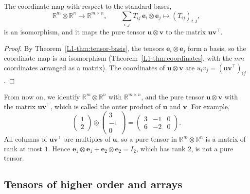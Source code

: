 \begin{corollary}\label{L1-cor:tensor-matrices}
    The coordinate map with respect to the standard bases,
    \[\mathbb{R}^m \otimes \mathbb{R}^n \to \mathbb{R}^{m \times n}, \qquad \sum_{i,j} T_{ij}\, \mathbf{e}_i \otimes \mathbf{e}_j \mapsto (T_{ij})_{i,j},\]
    is an isomorphism, and it maps the pure tensor $\mathbf{u} \otimes \mathbf{v}$ to the matrix $\mathbf{u}\mathbf{v}^\top$.
\end{corollary}

\begin{proof}
    By Theorem~\ref{L1-thm:tensor-basis}, the tensors $\mathbf{e}_i \otimes \mathbf{e}_j$ form a basis, so the coordinate map is an isomorphism (Theorem~\ref{L1-thm:coordinates}, with the $mn$ coordinates arranged as a matrix). The coordinates of $\mathbf{u} \otimes \mathbf{v}$ are $u_iv_j = (\mathbf{u}\mathbf{v}^\top)_{ij}$.
\end{proof}

From now on, we identify $\mathbb{R}^m \otimes \mathbb{R}^n$ with $\mathbb{R}^{m \times n}$, and the pure tensor $\mathbf{u} \otimes \mathbf{v}$ with the matrix $\mathbf{u}\mathbf{v}^\top$, which is called the outer product of $\mathbf{u}$ and $\mathbf{v}$. For example,
\[\begin{pmatrix} 1 \\ 2 \end{pmatrix} \otimes \begin{pmatrix} 3 \\ -1 \\ 0 \end{pmatrix} = \begin{pmatrix} 3 & -1 & 0 \\ 6 & -2 & 0 \end{pmatrix}.\]
All columns of $\mathbf{u}\mathbf{v}^\top$ are multiples of $\mathbf{u}$, so a pure tensor in $\mathbb{R}^m \otimes \mathbb{R}^n$ is a matrix of rank at most $1$. Hence $\mathbf{e}_1 \otimes \mathbf{e}_1 + \mathbf{e}_2 \otimes \mathbf{e}_2 = I_2$, which has rank $2$, is not a pure tensor.

\subsection{Tensors of higher order and arrays}

